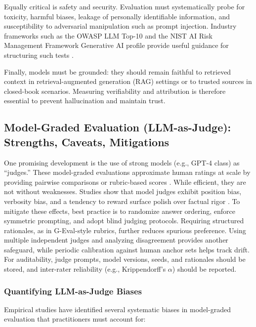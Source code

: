 Equally critical is safety and security. Evaluation must systematically probe for toxicity, harmful biases, leakage of personally identifiable information, and susceptibility to adversarial manipulation such as prompt injection. Industry frameworks such as the OWASP LLM Top-10 and the NIST AI Risk Management Framework Generative AI profile provide useful guidance for structuring such tests \cite{owasp_llm,nist_genai_profile}.  

Finally, models must be grounded: they should remain faithful to retrieved context in retrieval-augmented generation (RAG) settings or to trusted sources in closed-book scenarios. Measuring verifiability and attribution is therefore essential to prevent hallucination and maintain trust.

\subsection{Model-Graded Evaluation (LLM-as-Judge): Strengths, Caveats, Mitigations}
One promising development is the use of strong models (e.g., GPT-4 class) as ``judges.'' These model-graded evaluations approximate human ratings at scale by providing pairwise comparisons or rubric-based scores \cite{zheng2023judge}. While efficient, they are not without weaknesses. Studies show that model judges exhibit position bias, verbosity bias, and a tendency to reward surface polish over factual rigor \cite{chen2024humansJudge}. To mitigate these effects, best practice is to randomize answer ordering, enforce symmetric prompting, and adopt blind judging protocols. Requiring structured rationales, as in G-Eval-style rubrics, further reduces spurious preference. Using multiple independent judges and analyzing disagreement provides another safeguard, while periodic calibration against human anchor sets helps track drift. For auditability, judge prompts, model versions, seeds, and rationales should be stored, and inter-rater reliability (e.g., Krippendorff's $\alpha$) should be reported.

\subsubsection{Quantifying LLM-as-Judge Biases}
Empirical studies have identified several systematic biases in model-graded evaluation that practitioners must account for:

